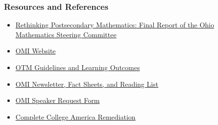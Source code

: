 \documentclass[14pt]{beamer}
\newcounter{a}
\newcounter{b}
\begin{document}
\begin{frame}[allowframebreaks]
  \frametitle{Resources and References}

  \begin{itemize}
\item \href{https://ohiohighered.org/sites/ohiohighered.org/files/uploads/math/MATH-REPORT_FINAL_4.22.14.pdf}{Rethinking Postsecondary Mathematics: Final Report of the Ohio Mathematics Steering Committee}
\item \href{https://ohiohighered.org/mathematics-initiative-documents}{OMI Website}
\item \href{https://www.ohiohighered.org/transfer/transfermodule/learningoutcomes}{OTM Guidelines and Learning Outcomes}
\item \href{https://www.ohiohighered.org/content/ohio_mathematics_initiative_resources}{OMI Newsletter, Fact Sheets, and Reading List}
\item \href{https://www.ohiohighered.org/mathematics-initiative-resources/presenter-request}{OMI Speaker Request Form}
\item \href{http://www.completecollege.org/docs/Ohio_remediation.pdf}{Complete College America Remediation}

  \end{itemize}


\end{frame}
\end{document}
